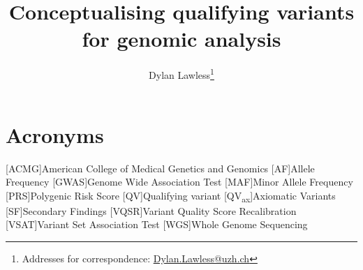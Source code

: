 
\usepackage[printonlyused,withpage,nohyperlinks]{acronym}
% 


\newcommand{\boxlabel}[1]{%
  \refstepcounter{myboxcounter}%
  \label{#1}%
}




\title{Conceptualising qualifying variants for genomic analysis}

\author[1]{Dylan Lawless\thanks{Addresses for correspondence: \href{mailto:Dylan.Lawless@uzh.ch}{Dylan.Lawless@uzh.ch}}}


\maketitle
\justify

\section*{Acronyms}
\renewenvironment{description} %
{\list{}{\labelwidth0pt\itemindent-\leftmargin
    \parsep-1em\itemsep0pt\let\makelabel\descriptionlabel}}
               {\endlist}
\begin{acronym} 
 [ACMG]{American College of Medical Genetics and Genomics}
 [AF]{Allele Frequency}
 [GWAS]{Genome Wide Association Test}
 [MAF]{Minor Allele Frequency}
 [PRS]{Polygenic Risk Score}
 [QV]{Qualifying variant}
 [QV\textsubscript{ax}]{Axiomatic Variants}
  [SF]{Secondary Findings}
 [VQSR]{Variant Quality Score Recalibration}
 [VSAT]{Variant Set Association Test}
 [WGS]{Whole Genome Sequencing}
\end{acronym}

